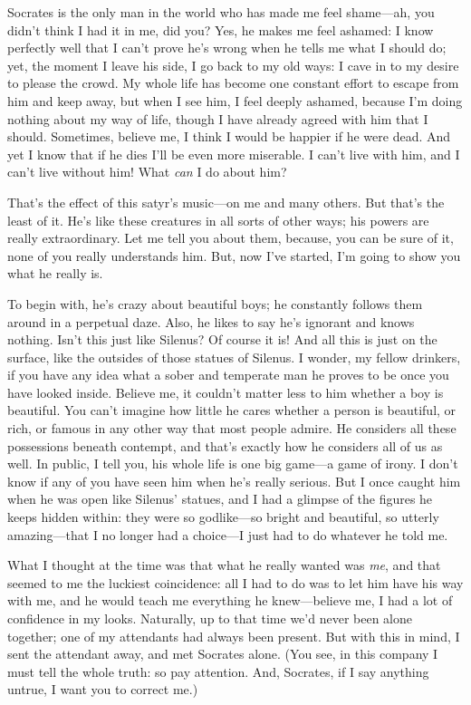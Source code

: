 Socrates is the only man in the world who has made me feel shame---ah,
you didn’t think I had it in me, did you? Yes, he makes me feel ashamed:
I know perfectly well that I can’t prove he’s wrong when he tells me
what I should do; yet, the moment I leave his side, I go back to my old
ways: I cave in to my desire to please the crowd. My whole life has
become one constant effort to escape from him and keep away, but when I
see him, I  feel deeply ashamed, because I’m doing nothing about
my way of life, though I have already agreed with him that I should.
Sometimes, believe me, I think I would be happier if he were dead. And
yet I know that if he dies I’ll be even more miserable. I can’t live
with him, and I can’t live without him! What {\em can} I do about him?

That’s the effect of this satyr’s music---on me and many others. But
that’s the least of it. He’s like these creatures in all sorts of other
ways; his powers are really extraordinary. Let me tell you about them,
because,  you can be sure of it, none of you really understands
him. But, now I’ve started, I’m going to show you what he really is.

To begin with, he’s crazy about beautiful boys; he constantly follows
them around in a perpetual daze. Also, he likes to say he’s ignorant and
knows nothing. Isn’t this just like Silenus? Of course it is! And all
this is just on the surface, like the outsides of those statues of
Silenus. I wonder, my fellow drinkers, if you have any idea what a sober
and temperate man he proves to be once you have looked inside. Believe
me, it couldn’t matter less to him whether a boy is beautiful. You can’t
imagine how little he  cares whether a person is beautiful, or
rich, or famous in any other way that most people admire. He considers
all these possessions beneath contempt, and that’s exactly how he
considers all of us as well. In public, I tell you, his whole life is
one big game---a game of irony. I don’t know if any of you have seen him
when he’s really serious. But I once caught him when he was open like
Silenus’ statues, and I had a glimpse of the figures he keeps hidden
within: they were so godlike---so bright and beautiful, 
so utterly amazing---that I no longer had a choice---I just had to do
whatever he told me.

What I thought at the time was that what he really wanted was {\em me},
and that seemed to me the luckiest coincidence: all I had to do was to
let him have his way with me, and he would teach me everything he
knew---believe me, I had a lot of confidence in my looks. Naturally, up
to that time we’d never been alone together; one of my attendants had
always been present. But with this in mind, I sent the attendant away,
and met  Socrates alone. (You see, in this company I must tell
the whole truth: so pay attention. And, Socrates, if I say anything
untrue, I want you to correct me.)

